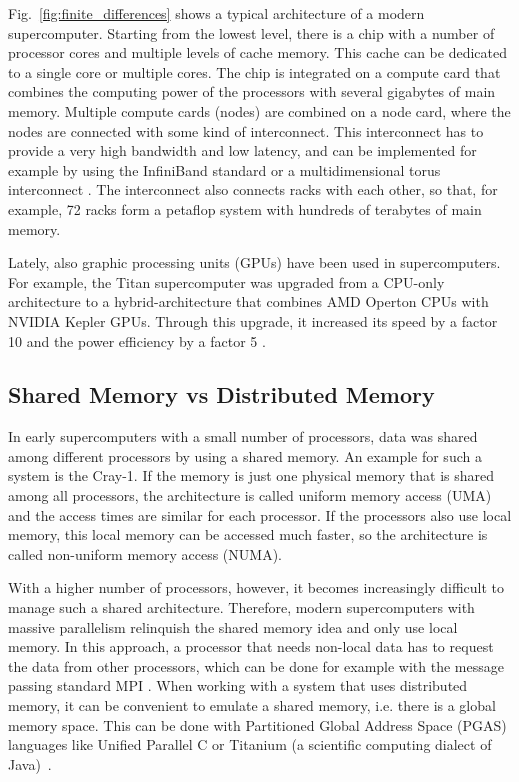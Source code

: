 Fig.~\ref{fig:finite_differences} shows a typical architecture of a modern supercomputer. Starting from the lowest level, there is a chip with a number of processor cores and multiple levels of cache memory. This cache can be dedicated to a single core or multiple cores. The chip is integrated on a compute card that combines the computing power of the processors with several gigabytes of main memory. Multiple compute cards (nodes) are combined on a node card, where the nodes are connected with some kind of interconnect. This interconnect has to provide a very high bandwidth and low latency, and can be implemented for example by using the InfiniBand standard \cite{liu2004high} or a multidimensional torus interconnect \cite{adiga2002overview}. The interconnect also connects racks with each other, so that, for example, 72 racks form a petaflop system with hundreds of terabytes of main memory.



Lately, also graphic processing units (GPUs) have been used in supercomputers. For example, the Titan supercomputer was upgraded from a CPU-only architecture to a hybrid-architecture that combines AMD Operton CPUs with NVIDIA Kepler GPUs. Through this upgrade, it increased its speed by a factor 10 and the power efficiency by a factor 5 \cite{titan}.


\subsection{Shared Memory vs Distributed Memory}

In early supercomputers with a small number of processors, data was shared among different processors by using a shared memory. An example for such a system is the Cray-1. If the memory is just one physical memory that is shared among all processors, the architecture is called uniform memory access (UMA) and the access times are similar for each processor. If the processors also use local memory, this local memory can be accessed much faster, so the architecture is called non-uniform memory access (NUMA). 

With a higher number of processors, however, it becomes increasingly difficult to manage such a shared architecture. Therefore, modern supercomputers with massive parallelism relinquish the shared memory idea and only use local memory. In this approach, a processor that needs non-local data has to request the data from other processors, which can be done for example with the message passing standard MPI \cite{mpi_forum}. When working with a system that uses distributed memory, it can be convenient to emulate a shared memory, i.e. there is a global memory space. This can be done with Partitioned Global Address Space (PGAS) languages like Unified Parallel C or Titanium (a scientific computing dialect of Java)~\cite{Yelick:2007:PPU:1278177.1278183}.


